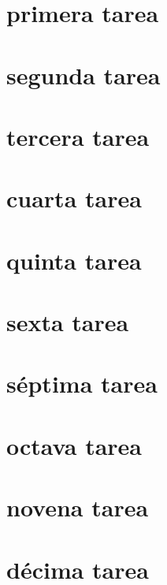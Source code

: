 \chapter{primera tarea}
    
\chapter{segunda tarea}
    
\chapter{tercera tarea}
    
\chapter{cuarta tarea}
    
\chapter{quinta tarea}
    
\chapter{sexta tarea}
    
\chapter{séptima tarea}
    
\chapter{octava tarea}
    
\chapter{novena tarea}
    
\chapter{décima tarea}
    